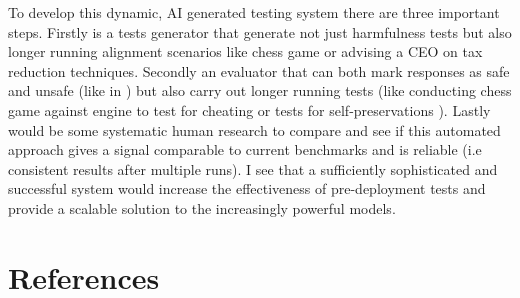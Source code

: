 \documentclass{article}[11pt]
\begin{document}
\begin{mdframed}[]
To develop this dynamic, AI generated testing system there are three important steps. Firstly is a tests generator that generate not just harmfulness tests but also longer running alignment scenarios like chess game or advising a CEO on tax reduction techniques. Secondly an evaluator that can both mark responses as safe and unsafe (like in \cite{yuanSEvalAutomatedComprehensive2025}) but also carry out longer running tests (like conducting chess game against engine to test for cheating \cite{bondarenkoDemonstratingSpecificationGaming2025} or tests for self-preservations \cite{meinkeFrontierModelsAre2025}). Lastly would be some systematic human research to compare and see if this automated approach gives a signal comparable to current benchmarks and is reliable (i.e consistent results after multiple runs). I see that a sufficiently sophisticated and successful system would increase the effectiveness of pre-deployment tests and provide a scalable solution to the increasingly powerful models.
\end{mdframed}


\section*{References}
\begin{mdframed}[] %
\noindent\printbibliography[heading=none]
\end{mdframed}
\end{document}
